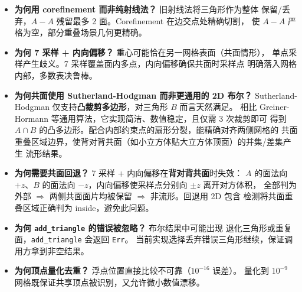 \documentclass[11pt,a4paper]{article}
\begin{document}
\begin{itemize}
  \item \textbf{为何用 corefinement 而非纯射线法？} 旧射线法将三角形作为整体
        保留/丢弃，$A - A$ 残留最多 2 面。Corefinement 在边交点处精确切割，
        使 $A - A$ 严格为空，部分重叠场景几何更精确。
  \item \textbf{为何 7 采样 + 内向偏移？} 重心可能恰在另一网格表面（共面情形），
        单点采样产生歧义。7 采样覆盖面内多点，内向偏移确保共面时采样点
        明确落入网格内部，多数表决鲁棒。
  \item \textbf{为何共面使用 Sutherland-Hodgman 而非更通用的 2D 布尔？}
        Sutherland-Hodgman 仅支持\textbf{凸裁剪多边形}，对三角形 $B$ 而言天然满足。
        相比 Greiner-Hormann 等通用算法，它实现简洁、数值稳定，且仅需 3 次裁剪即可
        得到 $A \cap B$ 的凸多边形。配合内部约束点的扇形分裂，能精确对齐两侧网格的
        共面重叠区域边界，使背对背共面（如小立方体贴大立方体顶面）的并集/差集产生
        流形结果。
  \item \textbf{为何需要共面回退？} 7 采样 + 内向偏移在\textbf{背对背共面}时失效：
        $A$ 的面法向 $+z$、$B$ 的面法向 $-z$，内向偏移使采样点分别向 $\pm z$ 离开对方体积，
        全部判为外部 $\Rightarrow$ 两侧共面面片均被保留 $\Rightarrow$ 非流形。回退用 2D 包含
        检测将共面重叠区域正确判为 inside，避免此问题。
  \item \textbf{为何 \texttt{add\_triangle} 的错误被忽略？} 布尔结果中可能出现
        退化三角形或重复面，\texttt{add\_triangle} 会返回 \texttt{Err}。
        当前实现选择丢弃错误三角形继续，保证调用方拿到非空结果。
  \item \textbf{为何顶点量化去重？} 浮点位置直接比较不可靠（$10^{-16}$ 误差）。
        量化到 $10^{-9}$ 网格既保证共享顶点被识别，又允许微小数值漂移。
\end{itemize}
\end{document}
